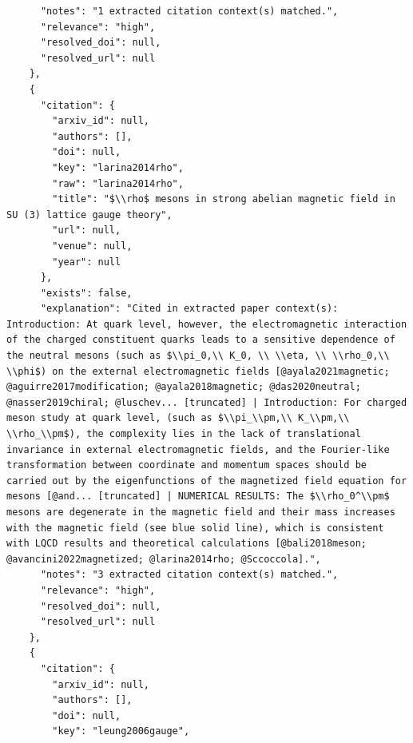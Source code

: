 \documentclass[11pt]{article}
\begin{document}
\begin{verbatim}
      "notes": "1 extracted citation context(s) matched.",
      "relevance": "high",
      "resolved_doi": null,
      "resolved_url": null
    },
    {
      "citation": {
        "arxiv_id": null,
        "authors": [],
        "doi": null,
        "key": "larina2014rho",
        "raw": "larina2014rho",
        "title": "$\\rho$ mesons in strong abelian magnetic field in SU (3) lattice gauge theory",
        "url": null,
        "venue": null,
        "year": null
      },
      "exists": false,
      "explanation": "Cited in extracted paper context(s): Introduction: At quark level, however, the electromagnetic interaction of the charged constituent quarks leads to a sensitive dependence of the neutral mesons (such as $\\pi_0,\\ K_0, \\ \\eta, \\ \\rho_0,\\ \\phi$) on the external electromagnetic fields [@ayala2021magnetic; @aguirre2017modification; @ayala2018magnetic; @das2020neutral; @nasser2019chiral; @luschev... [truncated] | Introduction: For charged meson study at quark level, (such as $\\pi_\\pm,\\ K_\\pm,\\ \\rho_\\pm$), the complexity lies in the lack of translational invariance in external electromagnetic fields, and the Fourier-like transformation between coordinate and momentum spaces should be carried out by the eigenfunctions of the magnetized field equation for mesons [@and... [truncated] | NUMERICAL RESULTS: The $\\rho_0^\\pm$ mesons are degenerate in the magnetic field and their mass increases with the magnetic field (see blue solid line), which is consistent with LQCD results and theoretical calculations [@bali2018meson; @avancini2022magnetized; @larina2014rho; @Sccoccola].",
      "notes": "3 extracted citation context(s) matched.",
      "relevance": "high",
      "resolved_doi": null,
      "resolved_url": null
    },
    {
      "citation": {
        "arxiv_id": null,
        "authors": [],
        "doi": null,
        "key": "leung2006gauge",

\end{verbatim}
\end{document}
